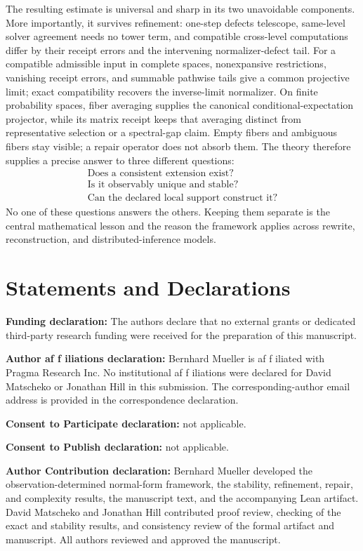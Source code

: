\documentclass[11pt]{article}
\theoremstyle{definition}
\theoremstyle{remark}
\numberwithin{equation}{section}
\begin{document}
The resulting estimate is universal and sharp in its two unavoidable components.  More importantly, it survives refinement: one-step defects telescope, same-level solver agreement needs no tower term, and compatible cross-level computations differ by their receipt errors and the intervening normalizer-defect tail.  For a compatible admissible input in complete spaces, nonexpansive restrictions, vanishing receipt errors, and summable pathwise tails give a common projective limit; exact compatibility recovers the inverse-limit normalizer.  On finite probability spaces, fiber averaging supplies the canonical conditional-expectation projector, while its matrix receipt keeps that averaging distinct from representative selection or a spectral-gap claim.  Empty fibers and ambiguous fibers stay visible; a repair operator does not absorb them.  The theory therefore supplies a precise answer to three different questions:
\[
\boxed{
\begin{array}{c}
\text{Does a consistent extension exist?}\\
\text{Is it observably unique and stable?}\\
\text{Can the declared local support construct it?}
\end{array}}
\]
No one of these questions answers the others.  Keeping them separate is the central mathematical lesson and the reason the framework applies across rewrite, reconstruction, and distributed-inference models.

\section*{Statements and Declarations}

\noindent\textbf{Funding declaration:} The authors declare that no external grants or dedicated
third-party research funding were received for the preparation of this manuscript.

\noindent\textbf{Author af\kern0pt f\kern0pt iliations declaration:} Bernhard Mueller is af\kern0pt f\kern0pt iliated with
Pragma Research Inc. No institutional af\kern0pt f\kern0pt iliations were declared for David Matscheko or
Jonathan Hill in this submission. The corresponding-author email address is provided in the
correspondence declaration.

\noindent\textbf{Consent to Participate declaration:} not applicable.

\noindent\textbf{Consent to Publish declaration:} not applicable.

\noindent\textbf{Author Contribution declaration:} Bernhard Mueller developed the
observation-determined normal-form framework, the stability, refinement, repair, and complexity
results, the manuscript text, and the accompanying Lean artifact. David Matscheko and Jonathan Hill
contributed proof review, checking of the exact and stability results, and consistency review of
the formal artifact and manuscript. All authors reviewed and approved the manuscript.
\end{document}
